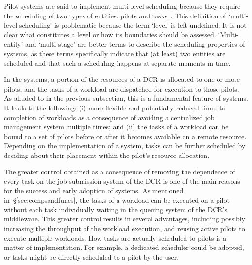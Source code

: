 \documentclass{sig-alternate}
\begin{document}
Pilot systems are said to implement multi-level scheduling because they require
the scheduling of two types of entities: pilots and
tasks~\cite{rubio2015gwpilot,de2014panda,balderrama2012scalable}. This
definition of `multi-level scheduling' is problematic because the term `level'
is left undefined. It is not clear what constitutes a level or how its
boundaries should be assessed. `Multi-entity' and `multi-stage' are better terms
to describe the scheduling properties of \pilot systems, as these terms
specifically indicate that (at least) two entities are scheduled and that such a
scheduling happens at separate moments in time.

In the \pilot systems, a portion of the resources of a DCR is allocated to one
or more pilots, and the tasks of a workload are dispatched for execution to
those pilots. As alluded to in the previous subsection, this is a fundamental
feature of \pilot systems. It leads to the following: (i) more flexible and
potentially reduced times to completion of workloads as a consequence of
avoiding a centralized job management system multiple times; and (ii) the tasks
of a workload can be bound to a set of pilots before or after it becomes
available on a remote resource. Depending on the implementation of a \pilot
system, tasks can be further scheduled by deciding about their placement within
the pilot's resource allocation.




The greater control obtained as a consequence of removing the dependence of
every task on the job submission system of the DCR is one of the main reasons
for the success and early adoption of \pilot systems. As mentioned
in~\S\ref{sec:compsandfuncs}, the tasks of a workload can be executed on a pilot
without each task individually waiting in the queuing system of the DCR's
middleware. This greater control results in several advantages, including
possibly increasing the throughput of the workload execution, and reusing active
pilots to execute multiple workloads. How tasks are actually scheduled to pilots
is a matter of implementation. For example, a dedicated scheduler could be
adopted, or tasks might be directly scheduled to a pilot by the user.
\end{document}
